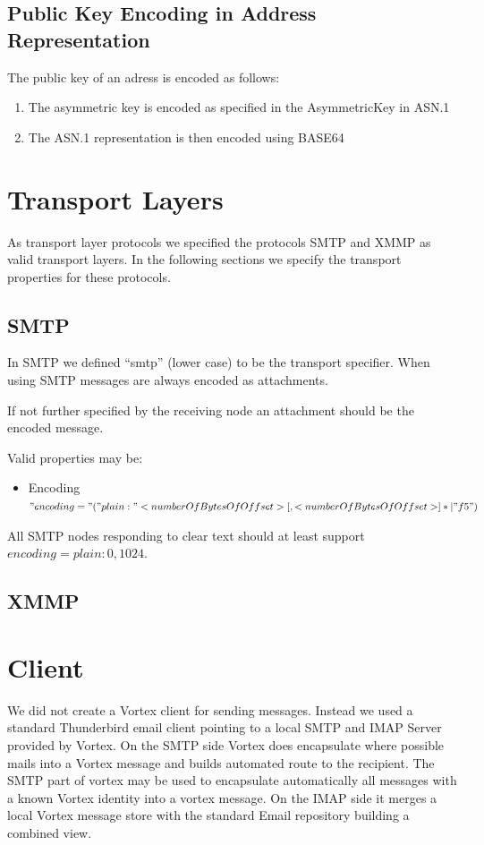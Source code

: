 \subsection{Public Key Encoding in Address Representation}
The public key of an adress is encoded as follows:
\begin{enumerate}
	\item The asymmetric key is encoded as specified in the AsymmetricKey in ASN.1
	\item The ASN.1 representation is then encoded using BASE64
\end{enumerate}	

\section{Transport Layers}
As transport layer protocols we specified the protocols SMTP and XMMP as valid transport layers. In the following sections we specify the transport properties for these protocols.

\subsection{SMTP}
In SMTP we defined ``smtp'' (lower case) to be the transport specifier. When using SMTP messages are always encoded as attachments. 

If not further specified by the receiving node an attachment should be the encoded message. 

Valid properties may be:
\begin{itemize}
	\item Encoding $"encoding="("plain:"<numberOfBytesOfOffset>[,<numberOfBytesOfOffset>]*|"f5")$
\end{itemize}

All SMTP nodes responding to clear text should at least support $encoding=plain:0,1024$.


\subsection{XMMP}

\section{Client}
We did not create a Vortex client for sending messages. Instead we used a standard Thunderbird email client pointing to a local SMTP and IMAP Server provided by Vortex. On the SMTP side Vortex does encapsulate where possible mails into a Vortex message and builds automated route to the recipient. The SMTP part of vortex may be used to encapsulate automatically all messages with a known Vortex identity into a vortex message. On the IMAP side it merges a local Vortex message store with the standard Email repository building a combined view.

